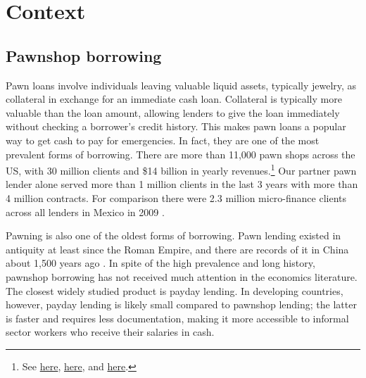 \documentclass[12pt, a4paper]{article}
\begin{document}
\section{Context} \label{context}

\subsection{Pawnshop borrowing}
    
Pawn loans involve individuals leaving valuable liquid assets, typically jewelry, as collateral in exchange for an immediate cash loan. Collateral is typically more valuable than the loan amount, allowing lenders to give the loan immediately without checking a borrower's credit history. This makes pawn loans a popular way to get cash to pay for emergencies. In fact, they are one of the most prevalent forms of borrowing. There are more than 11,000 pawn shops across the US, with 30 million clients and \$14 billion in yearly revenues.\footnote{See
\href{https://tinyurl.com/ybm56dpe}{here}, \href{https://tinyurl.com/y9zdcgws}{here}, and \href{https://tinyurl.com/y59ptdam}{here}.}
Our partner pawn lender alone served more than 1 million clients in the last 3 years with more than 4 million contracts. For comparison there were 2.3 million micro-finance clients across all lenders in Mexico in 2009 \citep{Pedroza:2010}. 

Pawning is also one of the oldest forms of borrowing. Pawn lending existed in antiquity at least since the Roman Empire, and there are records of it in China about 1,500 years ago \citep{PawnShops}. In spite of the high prevalence and long history, pawnshop borrowing has not received much attention in the economics literature. The closest widely studied product is payday lending. In developing countries, however, payday lending is likely small compared to pawnshop lending; the latter is faster and requires less documentation, making it more accessible to informal sector workers who receive their salaries in cash. %

\end{document}
